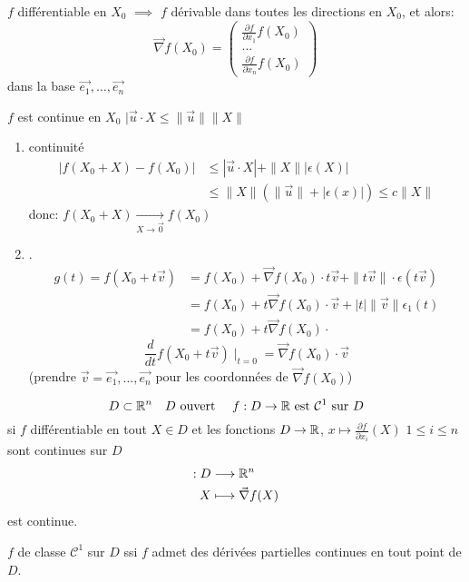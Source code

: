 \begin{prop}
   $f$ différentiable en  $X_0$ $\implies$ $f$ dérivable dans toutes les directions en  $X_0$, et alors: 
   \[
       \vec{\nabla}f(X_0) = \begin{pmatrix} \frac{\partial f}{\partial x_1}f(X_0)\\ \ldots \\  \frac{\partial f}{\partial x_n}f(X_0)\end{pmatrix} 
   \] 
   dans la base $\vec{e_1}, \ldots, \vec{e_n}$
\end{prop}

\begin{preuve}
$f$ est continue en  $X_0$ $|\vec{u} \cdot X \le \|\vec{u}\| \|X\|$
\begin{enumerate}
    \item continuité
        \begin{align*}
            |f(X_0 + X) - f(X_0)| &\le |\vec{u} \cdot X| + \|X\| |\epsilon(X)|\\
                                  &\le \|X\|\left( \|\vec{u}\| + |\epsilon(x)|  \right) \le c\|X\|
        \end{align*}
        donc: $f(X_0 + X) \xrightarrow[X \to \vec{0}]{} f(X_0)$
    \item .
        \begin{align*}
            g(t) = f(X_0 + t \vec{v}) &= f(X_0) + \vec{\nabla}f(X_0) \cdot t \vec{v} + \|t \vec{v}\| \cdot \epsilon(t \vec{v})\\
                                      &= f(X_0) + t\vec{\nabla}f(X_0) \cdot \vec{v} + |t|\|\vec{v}\|\epsilon_1(t)\\
                                      &= f(X_0) + t\vec{\nabla }f(X_0)\cdot 
        \end{align*}
        \[
            \frac{d}{dt} f(X_0 + t\vec{v})\mid_{t = 0} = \vec{\nabla}f(X_0)\cdot \vec{v}
        \] 
        (prendre $\vec{v} = \vec{e_1}, \ldots, \vec{e_n}$ pour les coordonnées de $\vec{\nabla}f(X_0)$)
\end{enumerate}
\end{preuve}
\begin{definition}
    \[
        D \subset \mathbb{R}^n \quad D \text{ ouvert } \quad f: D \to \mathbb{R} \text{ est } \mathcal{C}^1 \text{ sur } D
    \] 
    si $f$ différentiable en tout  $X \in D$ et les fonctions  $D \to \mathbb{R}$, $x \mapsto \frac{\partial f}{\partial x_i}(X)$ $1 \le i \le n$ sont continues sur $D$
    \begin{align*}
        : D &\longrightarrow \mathbb{R}^n \\
        X &\longmapsto \vec{\nabla}f(X)
    \end{align*}
    est continue.
\end{definition}
\begin{theorem}
    $f$ de classe  $\mathcal{C}^1$ sur  $D$ ssi  $f$ admet des dérivées partielles continues en tout point de  $D$. 
\end{theorem}

